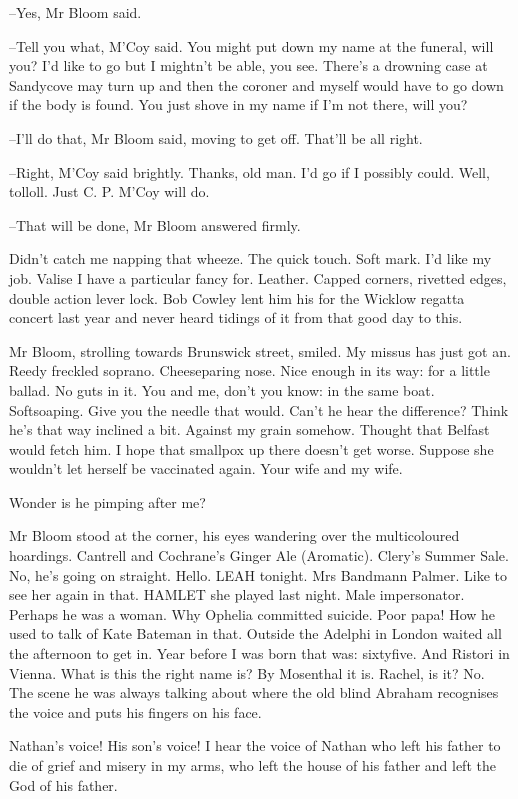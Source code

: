 --Yes, Mr Bloom said.

--Tell you what, M'Coy said. You might put down my name at the funeral,
will you? I'd like to go but I mightn't be able, you see. There's a
drowning case at Sandycove may turn up and then the coroner and myself
would have to go down if the body is found. You just shove in my name if
I'm not there, will you?

--I'll do that, Mr Bloom said, moving to get off. That'll be all right.

--Right, M'Coy said brightly. Thanks, old man. I'd go if I possibly
could. Well, tolloll. Just C. P. M'Coy will do.

--That will be done, Mr Bloom answered firmly.

Didn't catch me napping that wheeze. The quick touch. Soft mark. I'd like
my job. Valise I have a particular fancy for. Leather. Capped corners,
rivetted edges, double action lever lock. Bob Cowley lent him his for the
Wicklow regatta concert last year and never heard tidings of it from that
good day to this.

Mr Bloom, strolling towards Brunswick street, smiled. My missus has just
got an. Reedy freckled soprano. Cheeseparing nose. Nice enough in its
way: for a little ballad. No guts in it. You and me, don't you know: in
the same boat. Softsoaping. Give you the needle that would. Can't he hear
the difference? Think he's that way inclined a bit. Against my grain
somehow. Thought that Belfast would fetch him. I hope that smallpox up
there doesn't get worse. Suppose she wouldn't let herself be vaccinated
again. Your wife and my wife.

Wonder is he pimping after me?

Mr Bloom stood at the corner, his eyes wandering over the multicoloured
hoardings. Cantrell and Cochrane's Ginger Ale (Aromatic). Clery's Summer
Sale. No, he's going on straight. Hello. LEAH tonight. Mrs Bandmann
Palmer. Like to see her again in that. HAMLET she played last night. Male
impersonator. Perhaps he was a woman. Why Ophelia committed suicide. Poor
papa! How he used to talk of Kate Bateman in that. Outside the Adelphi in
London waited all the afternoon to get in. Year before I was born that
was: sixtyfive. And Ristori in Vienna. What is this the right name is? By
Mosenthal it is. Rachel, is it? No. The scene he was always talking about
where the old blind Abraham recognises the voice and puts his fingers on
his face.

Nathan's voice! His son's voice! I hear the voice of Nathan who left his
father to die of grief and misery in my arms, who left the house of his
father and left the God of his father.

